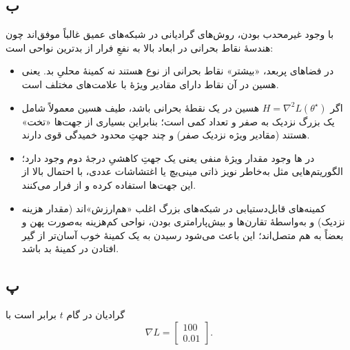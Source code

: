 \subsection*{ب}
با وجود غیرمحدب بودن، روش‌های گرادیانی در شبکه‌های عمیق غالباً موفق‌اند چون هندسهٔ نقاط بحرانی در ابعاد بالا به نفعِ فرار از بدترین نواحی است:
\begin{itemize}
    \item در فضاهای پربعد، «بیشتر» نقاط بحرانی از نوع  هستند نه کمینهٔ محلیِ بد. یعنی هسین در آن نقاط دارای مقادیر ویژهٔ با علامت‌های مختلف است.
    \item اگر $H=\nabla^2 L(\theta^\star)$ هسین در یک نقطهٔ بحرانی باشد، طیف هسین معمولاً شامل یک  بزرگ نزدیک به صفر و تعداد کمی  است؛ بنابراین بسیاری از جهت‌ها «تخت» هستند (مقادیر ویژه نزدیک صفر) و چند جهتِ محدود خمیدگی قوی دارند.
    \item در ها وجود مقدار ویژهٔ منفی یعنی یک جهتِ کاهشیِ درجهٔ دوم وجود دارد؛ الگوریتم‌هایی مثل  به‌خاطر نویز ذاتی مینی‌بچ یا اغتشاشات عددی، با احتمال بالا از این جهت‌ها استفاده کرده و از  فرار می‌کنند.
    \item کمینه‌های قابل‌دستیابی در شبکه‌های بزرگ اغلب «هم‌ارزش»‌اند (مقدار هزینه نزدیک) و به‌واسطهٔ تقارن‌ها و بیش‌پارامتری بودن، نواحی کم‌هزینه به‌صورت پهن و بعضاً به هم متصل‌اند؛ این باعث می‌شود رسیدن به یک کمینهٔ خوب آسان‌تر از گیر افتادن در کمینهٔ بد باشد.
\end{itemize}

\subsection*{پ}
گرادیان در گام $t$ برابر است با
\[
\nabla L = 
\begin{bmatrix}
100\\
0.01
\end{bmatrix}.
\]

